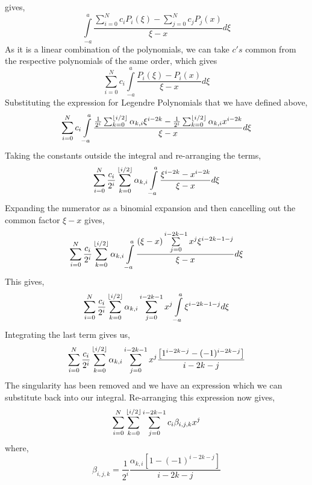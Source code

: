 \documentclass[1p,preprint,12pt]{elsarticle1}
\DeclarePairedDelimiter\floor{\lfloor}{\rfloor}
\begin{document}
gives,
\begin{equation}
\int\limits_{-a}^{a}\frac{\sum\limits_{i=0}^{N}c_iP_i(\xi)-\sum\limits_{j=0}^{N}c_jP_j(x)}{\xi-x}d\xi
\end{equation}
As it is a linear combination of the polynomials, we can take $c's$ common from the respective polynomials of the same order, which gives
\begin{equation}
\sum\limits_{i=0}^{N}c_i\int\limits_{-a}^{a}\frac{P_i(\xi)-P_i(x)}{\xi-x}d\xi
\end{equation}
Substituting the expression for Legendre Polynomials that we have defined above,
\begin{equation}
\sum\limits_{i=0}^{N}c_i\int\limits_{-a}^{a}\frac{\frac{1}{2^i}\sum_{k=0}^{\floor*{i/2}}\alpha_{k,i}\xi^{i-2k}-\frac{1}{2^i}\sum_{k=0}^{\floor*{i/2}}\alpha_{k,i}x^{i-2k}}{\xi-x}d\xi
\end{equation}
Taking the constants outside the integral and re-arranging the terms,
\begin{equation}
\sum\limits_{i=0}^{N}\frac{c_i}{2^i}\sum\limits_{k=0}^{\floor*{i/2}}\alpha_{k,i}\int\limits_{-a}^{a}\frac{\xi^{i-2k}-x^{i-2k}}{\xi-x}d\xi
\end{equation}
Expanding the numerator as a binomial expansion and then cancelling out the common factor $\xi-x$ gives,
\begin{equation}
\sum\limits_{i=0}^{N}\frac{c_i}{2^i}\sum\limits_{k=0}^{\floor*{i/2}}\alpha_{k,i}\int\limits_{-a}^{a}\frac{(\xi-x)\sum\limits_{j=0}^{i-2k-1}x^j\xi^{i-2k-1-j}}{\xi-x}d\xi
\end{equation}
This gives,
\begin{equation}
\sum\limits_{i=0}^{N}\frac{c_i}{2^i}\sum\limits_{k=0}^{\floor*{i/2}}\alpha_{k,i}\sum\limits_{j=0}^{i-2k-1}x^j\int\limits_{-a}^{a}{\xi^{i-2k-1-j}}d\xi
\end{equation}
Integrating the last term gives us,
\begin{equation}
\sum\limits_{i=0}^{N}\frac{c_i}{2^i}\sum\limits_{k=0}^{\floor*{i/2}}\alpha_{k,i}\sum\limits_{j=0}^{i-2k-1}x^j\frac{\left[1^{i-2k-j} - (-1)^{i-2k-j}\right]}{i-2k-j}
\end{equation}
The singularity has been removed and we have an expression which we can substitute back into our integral. Re-arranging this expression now gives,
\begin{equation}
\sum\limits_{i=0}^{N}\sum\limits_{k=0}^{\floor*{i/2}}\sum\limits_{j=0}^{i-2k-1}c_i\beta_{i,j,k}x^j
\end{equation}
where, $$\beta_{i,j,k} = \frac{1}{2^i}\frac{\alpha_{k,i}[1-(-1)^{i-2k-j}]}{i-2k-j}$$
\end{document}
